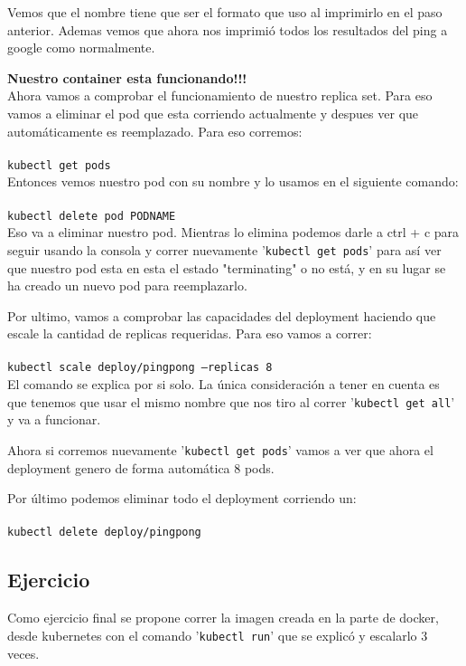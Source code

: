 \documentclass[11pt]{article} %
\begin{document}
Vemos que el nombre tiene que ser el formato que uso al imprimirlo en el paso anterior. Ademas vemos que ahora nos imprimió todos los resultados del ping a google como normalmente.

\textbf{Nuestro container esta funcionando!!!}\\

Ahora vamos a comprobar el funcionamiento de nuestro replica set. Para eso vamos a eliminar el pod que esta corriendo actualmente y despues ver que automáticamente es reemplazado. Para eso corremos:\\ \\ 
    \texttt{kubectl get pods} \\

Entonces vemos nuestro pod con su nombre y lo usamos en el siguiente comando:\\ \\
    \texttt{kubectl delete pod PODNAME} \\

Eso va a eliminar nuestro pod. Mientras lo elimina podemos darle a ctrl + c para seguir usando la consola y correr nuevamente '\texttt{kubectl get pods}' para así ver que nuestro pod esta en esta el estado "terminating" o no está, y en su lugar se ha creado un nuevo pod para reemplazarlo.

Por ultimo, vamos a comprobar las capacidades del deployment haciendo que escale la cantidad de replicas requeridas. Para eso vamos a correr:\\ \\
    \texttt{kubectl scale deploy/pingpong --replicas 8} \\

El comando se explica por si solo. La única consideración a tener en cuenta es que tenemos que usar el mismo nombre que nos tiro al correr '\texttt{kubectl get all}' y va a funcionar.

Ahora si corremos nuevamente '\texttt{kubectl get pods}' vamos a ver que ahora el deployment genero de forma automática 8 pods.

Por último podemos eliminar todo el deployment corriendo un:\\ \\
    \texttt{kubectl delete deploy/pingpong} \\

\subsection{Ejercicio}

Como ejercicio final se propone correr la imagen creada en la parte de docker, desde kubernetes con el comando '\texttt{kubectl run}' que se explicó y escalarlo 3 veces.
\end{document}
